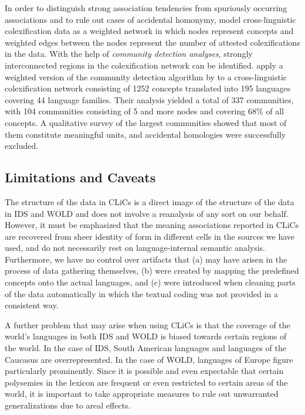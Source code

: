 In order to distinguish strong
association tendencies from
spuriously occurring associations and to rule out cases of accidental homonymy,  model cross-linguistic colexification data as a weighted network
in which nodes represent concepts and weighted edges between the nodes represent the number of
attested colexifications in the data.  With the help of \emph{community detection analyses}, strongly
interconnected regions in the colexification network can be identified.  apply
a weighted version of the community detection algorithm by  to a
cross-linguistic colexification network consisting of 1252 concepts translated into 195 languages
covering 44 language families. Their analysis yielded a total of 337 communities, with 104 communities
consisting of 5 and more nodes and covering 68\% of all concepts. A qualitative survey of the
largest communities showed that most of them constitute meaningful units, and accidental homologies
were successfully excluded.
\subsection{Limitations and Caveats} \label{caveats}
The structure of the data in CLiCs is a direct image of the structure of the data in IDS and WOLD
and does not involve a reanalysis of any sort on our behalf. However, it must be emphasized that the
meaning associations reported in CLiCs are recovered from sheer identity of form in different cells
in the sources we have used, and do not necessarily rest on language-internal semantic analysis.
Furthermore, we have no control over artifacts that (a) may have arisen in the process of data
gathering themselves, (b) were created by mapping the predefined concepts onto the actual languages,
and (c) were introduced when cleaning parts of the data automatically in which the textual coding
was not provided in a consistent way.
 
A further problem that may arise when using CLiCs is that the coverage of the world's languages in
both IDS and WOLD is biased towards certain regions of the world. In the case of IDS, South American
languages and languages of the Caucasus are overrepresented. In the case of WOLD, languages of
Europe figure particularly prominently. Since it is possible and even expectable that certain
polysemies in the lexicon are frequent or even restricted to certain areas of the world, it is
important to take appropriate measures to rule out unwarranted generalizations due to areal
effects.

